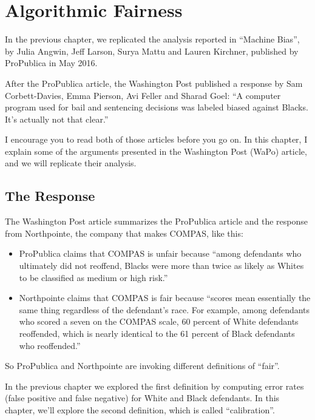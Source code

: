 \hypertarget{algorithmic-fairness}{%
\chapter{Algorithmic Fairness}\label{algorithmic-fairness}}

In the previous chapter, we replicated the analysis reported in
``Machine Bias'', by Julia Angwin, Jeff Larson, Surya Mattu and Lauren
Kirchner, published by ProPublica in May 2016.

After the ProPublica article, the Washington Post published a response
by Sam Corbett-Davies, Emma Pierson, Avi Feller and Sharad Goel: ``A
computer program used for bail and sentencing decisions was labeled
biased against Blacks. It's actually not that clear.''

I encourage you to read both of those articles before you go on. In this
chapter, I explain some of the arguments presented in the Washington
Post (WaPo) article, and we will replicate their analysis.

\hypertarget{the-response}{%
\section{The Response}\label{the-response}}

The Washington Post article summarizes the ProPublica article and the
response from Northpointe, the company that makes COMPAS, like this:

\begin{itemize}
\item
  ProPublica claims that COMPAS is unfair because ``among defendants who
  ultimately did not reoffend, Blacks were more than twice as likely as
  Whites to be classified as medium or high risk.''
\item
  Northpointe claims that COMPAS is fair because ``scores mean
  essentially the same thing regardless of the defendant's race. For
  example, among defendants who scored a seven on the COMPAS scale, 60
  percent of White defendants reoffended, which is nearly identical to
  the 61 percent of Black defendants who reoffended.''
\end{itemize}

So ProPublica and Northpointe are invoking different definitions of
``fair''.

In the previous chapter we explored the first definition by computing
error rates (false positive and false negative) for White and Black
defendants. In this chapter, we'll explore the second definition, which
is called ``calibration''.

